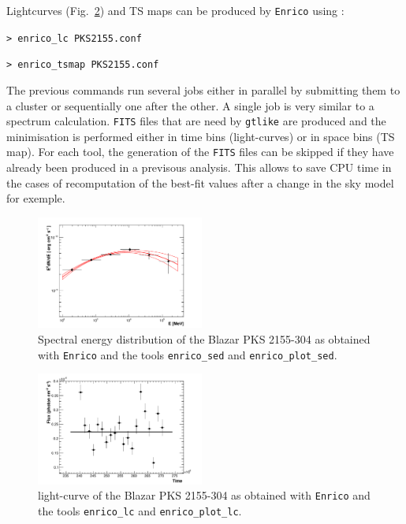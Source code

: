 \documentclass[a4paper]{article}
\begin{document}
Lightcurves (Fig.~\ref{fig:LC}) and TS maps can be produced by {\tt Enrico} using :

\mbox{{\tt> enrico\_lc PKS2155.conf}}

\mbox{{\tt> enrico\_tsmap PKS2155.conf}}

The previous commands run several jobs either in parallel by submitting them to
a cluster or sequentially one after the other. A single job is very similar to a
spectrum calculation. {\tt FITS} files that are need by {\tt gtlike} are
produced and the minimisation is performed either in time bins (light-curves) or
in space bins (TS map). For each tool, the generation of the {\tt FITS} files
can be skipped if they have already been produced in a previsous analysis. This
allows to save CPU time in the cases of recomputation of the best-fit values
after a change in the sky model for exemple.

 \begin{figure}[ht!]
  \centering
  \includegraphics[width=0.49\textwidth]{icrc2013_89_01}
  \caption{Spectral energy distribution of the Blazar PKS 2155-304 as obtained with {\tt Enrico} and the tools {\tt enrico\_sed} and {\tt enrico\_plot\_sed}.}
  \label{fig:SED}
 \end{figure}

 \begin{figure}[ht!]
  \centering
  \includegraphics[width=0.49\textwidth]{icrc2013_89_02}
  \caption{light-curve of the Blazar PKS 2155-304 as obtained with {\tt Enrico} and the tools {\tt enrico\_lc} and {\tt enrico\_plot\_lc}.}
  \label{fig:LC}
 \end{figure}
\end{document}
